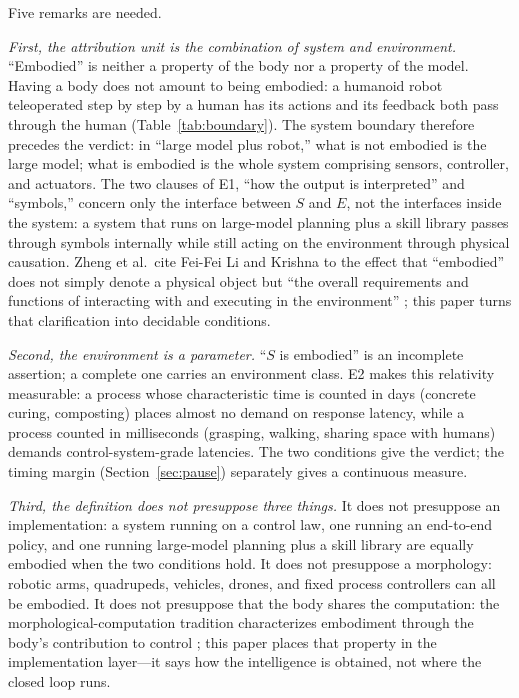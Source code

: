 \documentclass[10pt]{article}
\begin{document}
Five remarks are needed.

\textit{First, the attribution unit is the combination of system and environment.} ``Embodied'' is neither a property of the body nor a property of the model. Having a body does not amount to being embodied: a humanoid robot teleoperated step by step by a human has its actions and its feedback both pass through the human (Table~\ref{tab:boundary}). The system boundary therefore precedes the verdict: in ``large model plus robot,'' what is not embodied is the large model; what is embodied is the whole system comprising sensors, controller, and actuators. The two clauses of E1, ``how the output is interpreted'' and ``symbols,'' concern only the interface between $S$ and $E$, not the interfaces inside the system: a system that runs on large-model planning plus a skill library passes through symbols internally while still acting on the environment through physical causation. Zheng et al.\ cite Fei-Fei Li and Krishna to the effect that ``embodied'' does not simply denote a physical object but ``the overall requirements and functions of interacting with and executing in the environment'' \cite{zheng2026}; this paper turns that clarification into decidable conditions.

\textit{Second, the environment is a parameter.} ``$S$ is embodied'' is an incomplete assertion; a complete one carries an environment class. E2 makes this relativity measurable: a process whose characteristic time is counted in days (concrete curing, composting) places almost no demand on response latency, while a process counted in milliseconds (grasping, walking, sharing space with humans) demands control-system-grade latencies. The two conditions give the verdict; the timing margin (Section~\ref{sec:pause}) separately gives a continuous measure.

\textit{Third, the definition does not presuppose three things.} It does not presuppose an implementation: a system running on a control law, one running an end-to-end policy, and one running large-model planning plus a skill library are equally embodied when the two conditions hold. It does not presuppose a morphology: robotic arms, quadrupeds, vehicles, drones, and fixed process controllers can all be embodied. It does not presuppose that the body shares the computation: the morphological-computation tradition characterizes embodiment through the body's contribution to control \cite{pfeifer2006,muller2017,liu2025csur}; this paper places that property in the implementation layer---it says how the intelligence is obtained, not where the closed loop runs.
\end{document}
